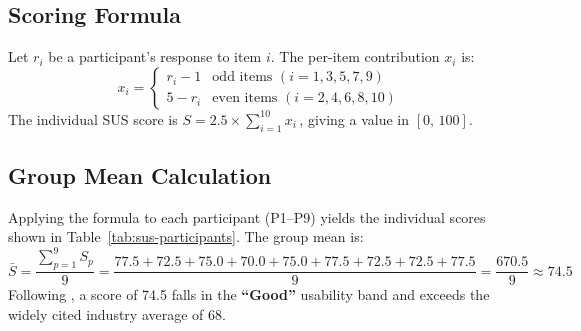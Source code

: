 \subsection*{Scoring Formula}

Let $r_i$ be a participant's response to item $i$. The per-item contribution $x_i$ is:
\[
x_i =
\begin{cases}
  r_i - 1 & \text{odd items } (i = 1,3,5,7,9) \\
  5 - r_i & \text{even items } (i = 2,4,6,8,10)
\end{cases}
\]
The individual SUS score is $S = 2.5 \times \displaystyle\sum_{i=1}^{10} x_i\,$, giving a value in $[0,\,100]$.

\subsection*{Group Mean Calculation}

Applying the formula to each participant (P1--P9) yields the individual scores shown in Table~\ref{tab:sus-participants}. The group mean is:
\[
\bar{S}
  = \frac{\displaystyle\sum_{p=1}^{9} S_p}{9}
  = \frac{77.5 + 72.5 + 75.0 + 70.0 + 75.0 + 77.5 + 72.5 + 72.5 + 77.5}{9}
  = \frac{670.5}{9}
  \approx \mathbf{74.5}
\]
Following \citet{Bangor2009}, a score of 74.5 falls in the \textbf{``Good''} usability band and exceeds the widely cited industry average of 68.

